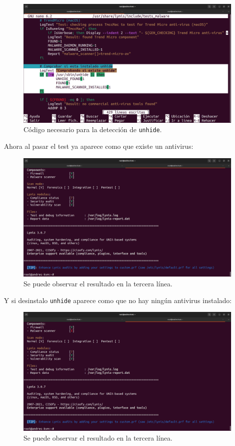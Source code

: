 \documentclass{article}
\begin{document}
\begin{figure}[H]
    \includegraphics[width=\textwidth]{imagenes/unhidetest.png}
    \caption{Código necesario para la detección de \texttt{unhide}.}
\end{figure}

\newpage

Ahora al pasar el test ya aparece como que existe un antivirus:

\begin{figure}[H]
    \includegraphics[width=\textwidth]{imagenes/lynisok.png}
    \caption{Se puede observar el resultado en la tercera línea.}
\end{figure}

\bigskip

Y si desinstalo \verb|unhide| aparece como que no hay ningún antivirus instalado:

\begin{figure}[H]
    \includegraphics[width=\textwidth]{imagenes/lynisnook.png}
    \caption{Se puede observar el resultado en la tercera línea.}
\end{figure}
\end{document}
